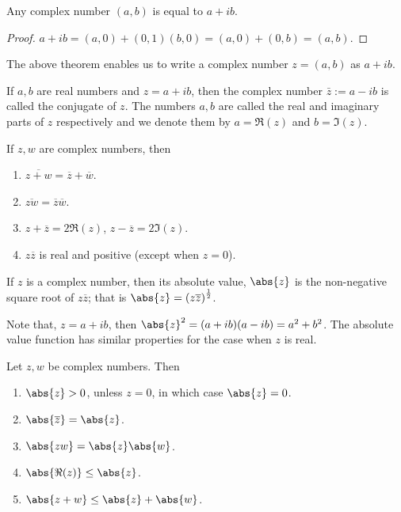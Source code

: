 \begin{Theorem}
    Any complex number $(a,b)$ is equal to $a + ib$.
\end{Theorem}
\begin{proof}
    $a + ib = (a,0) + (0,1)(b,0) = (a,0) + (0,b) = (a,b)$.
\end{proof}
The above theorem enables us to write a complex number $z = (a,b)$ as $a + ib$.
\begin{Definition}
    If $a,b$ are real numbers and $z = a + ib$, then the complex number $\bar{z} := a - ib$ is called the
    conjugate of $z$. The numbers $a,b$ are called the real and imaginary parts of $z$ respectively and we
    denote them by $a = \Re(z)$ and $b = \Im(z)$.
\end{Definition}
\begin{Theorem}
    If $z,w$ are complex numbers, then
    \begin{enumerate}
	\item
	    $\overline{z + w} = \overline{z} + \overline{w}$.
	\item
	    $\overline{zw} = \overline{z}\overline{w}$.
	\item
	    $z + \overline{z} = 2\Re{(z)}$, $z - \overline{z} = 2\Im{(z)}$. 
	\item
	    $z\overline{z}$ is real and positive (except when $z = 0$).
    \end{enumerate}
\end{Theorem}
\begin{Definition}
    If $z$ is a complex number, then its absolute value, $\abs{z}$ is the non-negative square root of
    $z\overline{z}$; that is $\abs{z} = {(z\overline{z})}^{\frac{1}{2}}$.
\end{Definition}
Note that, $z = a + ib$, then ${\abs{z}}^{2} = (a + ib)(a- ib) = a^2 + b^2$. The absolute value function has similar
properties for the case when $z$ is real.
\begin{Theorem}
    Let $z,w$ be complex numbers. Then 
    \begin{enumerate}
	\item
	    $\abs{z} > 0$, unless $z = 0$, in which case $\abs{z} = 0$.
	\item
	    $\abs{\overline{z}} = \abs{z}$.
	\item
	    $\abs{zw} = \abs{z}\abs{w}$.
	\item
	    $\abs{\Re(z)} \leq \abs{z}$.
	\item
	    $\abs{z + w} \leq \abs{z} + \abs{w}$.
    \end{enumerate}
\end{Theorem}
